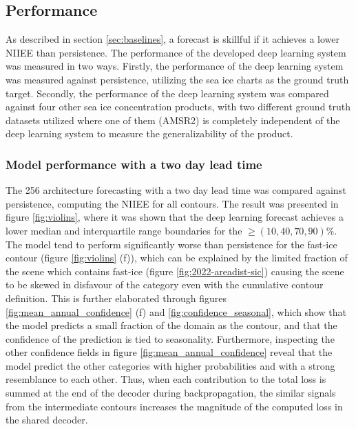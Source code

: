 \documentclass[../main/thesis]{subfiles}
\begin{document}
\subsection{Performance}
As described in section \ref{sec:baselines}, a forecast is skillful if it achieves a lower NIIEE than persistence. The performance of the developed deep learning system was measured in two ways. Firstly, the performance of the deep learning system was measured against persistence, utilizing the sea ice charts as the ground truth target. 
Secondly, the performance of the deep learning system was compared against four other sea ice concentration products, with two different ground truth datasets utilized where one of them (AMSR2) is completely independent of the deep learning system to measure the generalizability of the product.

\subsubsection{Model performance with a two day lead time}
\label{sec:performance_confidence}
The 256 architecture forecasting with a two day lead time was compared against persistence, computing the NIIEE for all contours. The result was presented in figure \ref{fig:violins}, where it was shown that the deep learning forecast achieves a lower median and interquartile range boundaries for the $\geq (10, 40, 70, 90)\%$. The model tend to perform significantly worse than persistence for the fast-ice contour (figure \ref{fig:violins} (f)), which can be explained by the limited fraction of the scene which contains fast-ice (figure \ref{fig:2022-areadist-sic}) causing the scene to be skewed in disfavour of the category even with the cumulative contour definition. This is further elaborated through figures \ref{fig:mean_annual_confidence} (f) and \ref{fig:confidence_seasonal}, which show that the model predicts a small fraction of the domain as the contour, and that the confidence of the prediction is tied to seasonality. Furthermore, inspecting the other confidence fields in figure \ref{fig:mean_annual_confidence} reveal that the model predict the other categories with higher probabilities and with a strong resemblance to each other. Thus, when each contribution to the total loss is summed at the end of the decoder during backpropagation, the similar signals from the intermediate contours increases the magnitude of the computed loss in the shared decoder. 
\end{document}
